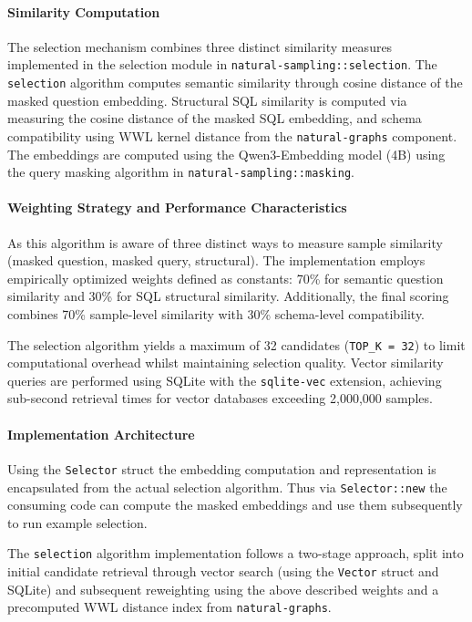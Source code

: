 \paragraph{Similarity Computation}

The selection mechanism combines three distinct similarity measures implemented
in the selection module in \texttt{natural-sampling::selection}. The 
\texttt{selection} algorithm computes semantic similarity through cosine
distance of the masked question embedding. Structural SQL similarity is
computed via measuring the cosine distance of the masked SQL embedding, and
schema compatibility using WWL kernel distance from the \texttt{natural-graphs}
component. The embeddings are computed using the Qwen3-Embedding model (4B)
using the query masking algorithm in \texttt{natural-sampling::masking}.

\paragraph{Weighting Strategy and Performance Characteristics}

As this algorithm is aware of three distinct ways to measure sample similarity
(masked question, masked query, structural). The implementation employs
empirically optimized weights defined as constants: 70\% for semantic question
similarity and 30\% for SQL structural similarity. Additionally, the final
scoring combines 70\% sample-level similarity with 30\% schema-level
compatibility.

The selection algorithm yields a maximum of 32 candidates (\texttt{TOP\_K =
32}) to limit computational overhead whilst maintaining selection quality.
Vector similarity queries are performed using SQLite with the \texttt{sqlite-vec}
extension, achieving sub-second retrieval times for vector databases exceeding
2,000,000 samples.

\paragraph{Implementation Architecture}

Using the \texttt{Selector} struct the embedding computation and representation
is encapsulated from the actual selection algorithm. Thus via
\texttt{Selector::new} the consuming code can compute the masked embeddings and
use them subsequently to run example selection.

The \texttt{selection} algorithm implementation follows a two-stage approach,
split into initial candidate retrieval through vector search (using the
\texttt{Vector} struct and SQLite) and subsequent reweighting using the above
described weights and a precomputed WWL distance index from
\texttt{natural-graphs}.


